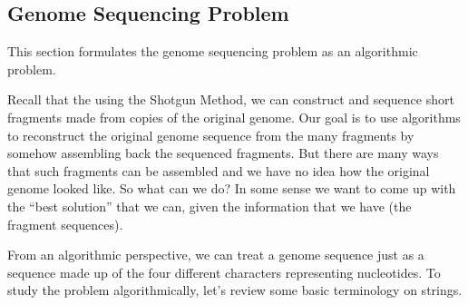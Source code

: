 




\subsection{Genome Sequencing Problem}

\begin{gram}
This section formulates the genome sequencing problem as an
algorithmic problem.
\end{gram}

\begin{gram}
Recall that the using the Shotgun Method, we can construct and sequence
short fragments made from copies of the original genome. 
%
Our goal is to use algorithms to reconstruct the original genome
sequence from the many fragments by somehow assembling back the
sequenced fragments.
%
But there are many ways that such fragments can be assembled and we
have no idea how the original genome looked like.  So what can we do?
%
In some sense we want to come up with the ``best solution'' that we
can, given the information that we have (the fragment sequences).
%
\end{gram}

\begin{gram}
From an algorithmic perspective, we can treat a genome sequence just
as a sequence made up of the four different characters representing
nucleotides.
%
To study the problem algorithmically, let's review some basic
terminology on strings.
\end{gram}

